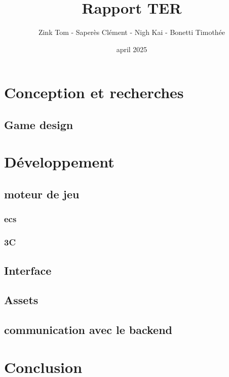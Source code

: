 \documentclass[french,a4paper,10pt]{article}
\title{\color{astral} \sffamily \bfseries Rapport TER}
\author{Zink Tom - Saperès Clément - Nigh Kai - Bonetti Timothée}
\date{april 2025}
\begin{document}
\maketitle

\hypersetup{
    hidelinks           %
}

\tableofcontents


\newpage


    

\newpage



\section{Conception et recherches}
    \subsection{Game design}
    
    
    
        
        


\section{Développement}
    
    
    \subsection{moteur de jeu}
        \subsubsection{ecs}
        \subsubsection{3C}

    \subsection{Interface}

    \subsection{Assets}
    
    
    
        
        
    \subsection{communication avec le backend}

\section{Conclusion}
\end{document}
